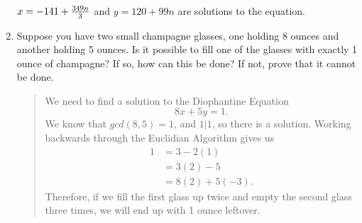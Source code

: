 \documentclass{hw}
\begin{document}
\begin{enumerate}
$x = -141 + {349n\over3}$ and $y = 120 + 99n$ are solutions to the equation.

\item Suppose you have two small champagne glasses, one holding 8 ounces and another holding 5 ounces. Is
it possible to fill one of the glasses with exactly 1 ounce of champagne? If so, how can this be done? If
not, prove that it cannot be done.
\begin{quote}
We need to find a solution to the Diophantine Equation
\[
8x+5y=1.
\]
We know that $gcd(8,5)=1$, and $1|1$, so there is a solution. Working backwards through the Euclidian
Algorithm gives us
\begin{align*}
1 &= 3-2(1)\\
&= 3(2)-5\\
&= 8(2)+5(-3).
\end{align*}
Therefore, if we fill the first glass up twice and empty the second glass three times, we will end up with
1 ounce leftover.
\end{quote}
\end{enumerate}
\end{document}
